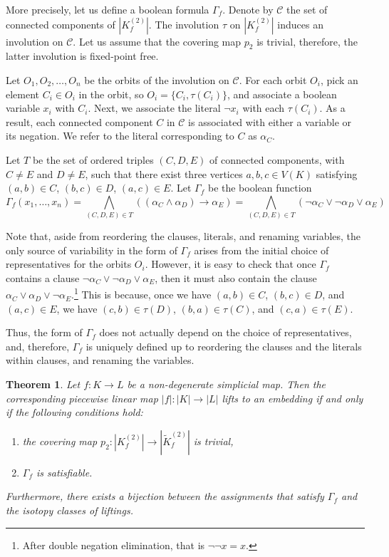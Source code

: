 \documentclass[a4paper,12pt,reqno,oneside]{amsart}
\theoremstyle{plain}
\newtheorem{theorem}{Theorem}
\theoremstyle{definition}
\theoremstyle{plain}
\newcommand{\from}{\colon}
\newcommand{\wt}[1]{\widetilde{#1}}
\newcommand{\CC}{\mathcal{C}}
\begin{document}
More precisely, let us define a boolean formula $\Gamma_f$. Denote by $\CC$ the set of connected
components of $|K^{(2)}_f|$. The involution $\tau$ on $|K^{(2)}_f|$ induces an involution on
$\CC$. Let us assume that the covering map $p_2$ is trivial, therefore, the latter involution is
fixed-point free.

Let $O_1, O_2, \dots, O_n$ be the orbits of the involution on $\CC$. For each orbit $O_i$, pick
an element $C_i \in O_i$ in the orbit, so $O_i = \{ C_i, \tau(C_i) \}$, and associate a boolean variable $x_i$
with $C_i$. Next, we associate the literal $\neg x_i$ with each $\tau(C_i)$. As a result, each
connected component $C$ in $\CC$ is associated with either a variable or its negation.
We refer to the literal corresponding to $C$ as $\alpha_C$.

Let $T$ be the set of ordered triples $(C, D, E)$ of connected components, with $C \neq E$ and
$D \neq E$, such that there exist three vertices $a, b, c \in V(K)$ satisfying $(a, b) \in C$,
$(b, c) \in D$, $(a, c) \in E$. Let $\Gamma_f$ be the boolean function
\[
  \Gamma_f(x_1, \dots, x_n) = \bigwedge_{(C, D, E) \in T} ((\alpha_C \land \alpha_D) \to \alpha_E)
                          = \bigwedge_{(C, D, E) \in T} (\neg \alpha_C \lor \neg \alpha_D \lor \alpha_E)
\]

Note that, aside from reordering the clauses, literals, and renaming variables, the only source of
variability in the form of $\Gamma_f$ arises from the initial choice of representatives for the
orbits $O_{i}$. However, it is easy to check that once $\Gamma_f$ contains a clause
$\neg \alpha_C \lor \neg \alpha_D \lor \alpha_E$, then it must also contain the clause
$\alpha_C \lor \alpha_D \lor \neg \alpha_E$.\footnote{After double negation elimination, that is
  $\neg \neg x = x$.} This is because, once we have $(a, b) \in C$, $(b, c) \in D$, and
$(a, c) \in E$, we have $(c, b) \in \tau(D)$, $(b, a) \in \tau(C)$, and $(c, a) \in
\tau(E)$.

Thus, the form of $\Gamma_{f}$ does not actually depend on the choice of representatives, and,
therefore, $\Gamma_f$ is uniquely defined up to reordering the clauses and the literals within
clauses, and renaming the variables.

\begin{theorem}\label{thm:gamma_cond}
  Let $f \from K \to L$ be a non-degenerate simplicial map. Then the corresponding piecewise linear map
  $|f| \from |K| \to |L|$ lifts to an embedding if and only if the following conditions hold:
  \begin{enumerate}
  \item\label{thm:gamma_cond:p2_trivial} the covering map $p_2 \from |K^{(2)}_f| \to |\wt{K}^{(2)}_f|$ is trivial,
  \item\label{thm:gamma_cond:gamma} $\Gamma_f$ is satisfiable.
  \end{enumerate}

  Furthermore, there exists a bijection between the assignments that satisfy $\Gamma_f$ and the isotopy classes of liftings.
\end{theorem}
\end{document}
